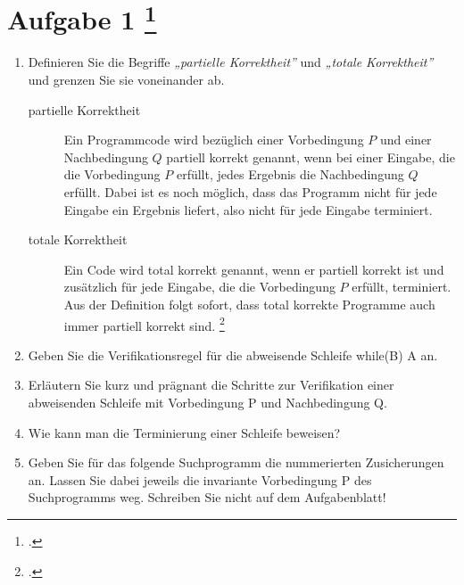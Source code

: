 \documentclass{lehramt-informatik-aufgabe}
\begin{document}
\section{Aufgabe 1
\footcite{66116:2020:09}}

\begin{enumerate}


\item Definieren Sie die Begriffe \emph{„partielle Korrektheit”} und
\emph{„totale Korrektheit”} und grenzen Sie sie voneinander ab.

\begin{liAntwort}
\begin{description}
\item[partielle Korrektheit]

Ein Programmcode wird bezüglich einer Vorbedingung $P$ und einer
Nachbedingung $Q$ partiell korrekt genannt, wenn bei einer Eingabe, die
die Vorbedingung $P$ erfüllt, jedes Ergebnis die Nachbedingung $Q$
erfüllt. Dabei ist es noch möglich, dass das Programm nicht für jede
Eingabe ein Ergebnis liefert, also nicht für jede Eingabe terminiert.

\item[totale Korrektheit]

Ein Code wird total korrekt genannt, wenn er partiell korrekt ist und
zusätzlich für jede Eingabe, die die Vorbedingung $P$ erfüllt,
terminiert. Aus der Definition folgt sofort, dass total korrekte
Programme auch immer partiell korrekt sind.
\footcite{wiki:korrektheit}
\end{description}
\end{liAntwort}


\item Geben Sie die Verifikationsregel für die abweisende Schleife
while(B) A an.


\item Erläutern Sie kurz und prägnant die Schritte zur Verifikation
einer abweisenden Schleife mit Vorbedingung P und Nachbedingung Q.


\item Wie kann man die Terminierung einer Schleife beweisen?


\item Geben Sie für das folgende Suchprogramm die nummerierten
Zusicherungen an. Lassen Sie dabei jeweils die invariante Vorbedingung P
des Suchprogramms weg. Schreiben Sie nicht auf dem Aufgabenblatt!



\end{enumerate}
\end{document}

